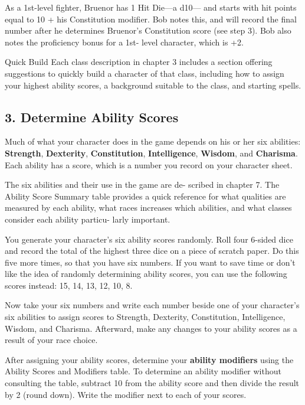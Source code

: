 As a 1st-level fighter, Bruenor has 1 Hit Die—a d10— and starts with hit points equal to 10 + his Constitution modifier. Bob notes this, and will record the final number after he determines Bruenor’s Constitution score (see step 3). Bob also notes the proficiency bonus for a 1st- level character, which is +2.

\begingroup
  \DndSetThemeColor[PhbTan]
  \begin{DndSidebar}{Quick Build}
    Each class description in chapter 3 includes a section offering suggestions to quickly build a character of that class, including how to assign your highest ability scores, a background suitable to the class, and starting spells.
  \end{DndSidebar}
\endgroup

\subsection{3. Determine Ability Scores}
Much of what your character does in the game depends on his or her six abilities: \textbf{Strength}, \textbf{Dexterity}, \textbf{Constitution}, \textbf{Intelligence}, \textbf{Wisdom}, and \textbf{Charisma}. Each ability has a score, which is a number you record on your character sheet.

The six abilities and their use in the game are de- scribed in chapter 7. The Ability Score Summary table provides a quick reference for what qualities are measured by each ability, what races increases which abilities, and what classes consider each ability particu- larly important.

You generate your character’s six ability scores randomly. Roll four 6-sided dice and record the total of the highest three dice on a piece of scratch paper. Do this five more times, so that you have six numbers. If you want to save time or don’t like the idea of randomly determining ability scores, you can use the following scores instead: 15, 14, 13, 12, 10, 8.

Now take your six numbers and write each number beside one of your character’s six abilities to assign scores to Strength, Dexterity, Constitution, Intelligence, Wisdom, and Charisma. Afterward, make any changes to your ability scores as a result of your race choice.

After assigning your ability scores, determine your \textbf{ability modifiers} using the Ability Scores and Modifiers table. To determine an ability modifier without consulting the table, subtract 10 from the ability score and then divide the result by 2 (round down). Write the modifier next to each of your scores.

